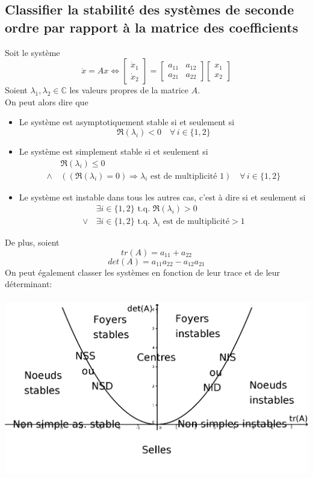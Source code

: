 \documentclass[a4paper]{article}
\begin{document}
\subsection{Classifier la stabilité des systèmes de seconde ordre par rapport à
la matrice des coefficients}
Soit le système
\[\dot x=Ax\Leftrightarrow
\begin{bmatrix}
	\dot x_1\\
	\dot x_2
\end{bmatrix}
=
\begin{bmatrix}
	a_{11} & a_{12}\\
	a_{21} & a_{22}
\end{bmatrix}
\begin{bmatrix}
	x_1\\
	x_2
\end{bmatrix}
\]
Soient \(\lambda_1, \lambda_2\in\mathbb{C}\) les valeurs propres de la matrice \(A\).\\
On peut alors dire que
\begin{itemize}
	\item Le système est asymptotiquement stable si et seulement si
		\[\Re(\lambda_i) < 0\quad\forall\, i\in\{1, 2\}\]
	\item Le système est simplement stable si et seulement si
		\begin{align*}
			&\Re(\lambda_i) \le 0 \\
			\land\,&
			((\Re(\lambda_i) = 0) \Rightarrow \lambda_i \text{ est de multiplicité } 1)
			\quad\forall\, i\in\{1, 2\}
		\end{align*}
	\item Le système est instable dans tous les autres cas, c'est à dire si et seulement si
		\begin{align*}
			&\exists i\in\{1, 2\} \text{ t.q. } \Re(\lambda_i) > 0 \\
			\lor\,&
			\exists i\in\{1, 2\} \text{ t.q. } \lambda_i \text{ est de multiplicité} > 1
		\end{align*}
\end{itemize}
De plus, soient
\[tr(A)=a_{11} + a_{22}\]
\[det(A)=a_{11}a_{22} - a_{12}a_{21}\]
On peut également classer les systèmes en fonction de leur trace et de leur
déterminant:\\
\\
\includegraphics{graphic.png}\\
\end{document}
